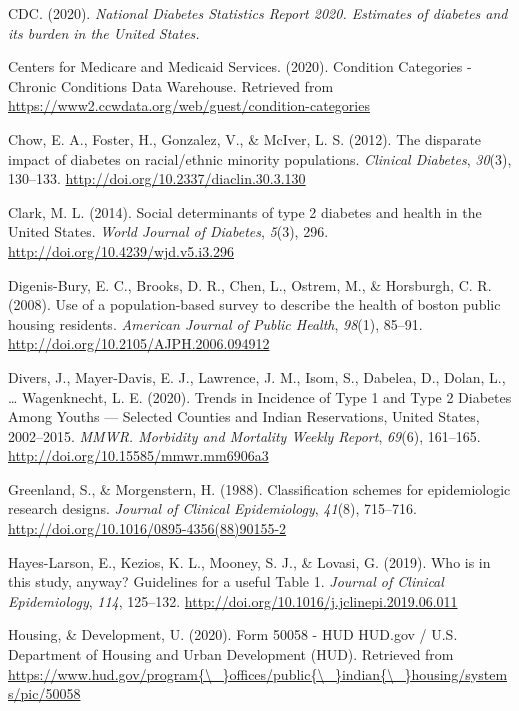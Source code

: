 \documentclass [11pt, proquest] {uwthesis}[2015/03/03]
\begin{document}
\hypertarget{ref-CDC2020}{}
CDC. (2020). \emph{National Diabetes Statistics Report 2020. Estimates
of diabetes and its burden in the United States.}

\hypertarget{ref-CMS2020}{}
Centers for Medicare and Medicaid Services. (2020). Condition Categories
- Chronic Conditions Data Warehouse. Retrieved from
\url{https://www2.ccwdata.org/web/guest/condition-categories}

\hypertarget{ref-Chow2012}{}
Chow, E. A., Foster, H., Gonzalez, V., \& McIver, L. S. (2012). The
disparate impact of diabetes on racial/ethnic minority populations.
\emph{Clinical Diabetes}, \emph{30}(3), 130--133.
\url{http://doi.org/10.2337/diaclin.30.3.130}

\hypertarget{ref-Clark2014}{}
Clark, M. L. (2014). Social determinants of type 2 diabetes and health
in the United States. \emph{World Journal of Diabetes}, \emph{5}(3),
296. \url{http://doi.org/10.4239/wjd.v5.i3.296}

\hypertarget{ref-Digenis-Bury2008}{}
Digenis-Bury, E. C., Brooks, D. R., Chen, L., Ostrem, M., \& Horsburgh,
C. R. (2008). Use of a population-based survey to describe the health of
boston public housing residents. \emph{American Journal of Public
Health}, \emph{98}(1), 85--91.
\url{http://doi.org/10.2105/AJPH.2006.094912}

\hypertarget{ref-Divers2020}{}
Divers, J., Mayer-Davis, E. J., Lawrence, J. M., Isom, S., Dabelea, D.,
Dolan, L., \ldots{} Wagenknecht, L. E. (2020). Trends in Incidence of
Type 1 and Type 2 Diabetes Among Youths --- Selected Counties and Indian
Reservations, United States, 2002--2015. \emph{MMWR. Morbidity and
Mortality Weekly Report}, \emph{69}(6), 161--165.
\url{http://doi.org/10.15585/mmwr.mm6906a3}

\hypertarget{ref-Greenland1988}{}
Greenland, S., \& Morgenstern, H. (1988). Classification schemes for
epidemiologic research designs. \emph{Journal of Clinical Epidemiology},
\emph{41}(8), 715--716.
\url{http://doi.org/10.1016/0895-4356(88)90155-2}

\hypertarget{ref-Hayes-Larson2019}{}
Hayes-Larson, E., Kezios, K. L., Mooney, S. J., \& Lovasi, G. (2019).
Who is in this study, anyway? Guidelines for a useful Table 1.
\emph{Journal of Clinical Epidemiology}, \emph{114}, 125--132.
\url{http://doi.org/10.1016/j.jclinepi.2019.06.011}

\hypertarget{ref-HUD2020}{}
Housing, \& Development, U. (2020). Form 50058 - HUD \textbar{} HUD.gov
/ U.S. Department of Housing and Urban Development (HUD). Retrieved from
\href{https://www.hud.gov/program\%7B/_\%7Doffices/public\%7B/_\%7Dindian\%7B/_\%7Dhousing/systems/pic/50058}{https://www.hud.gov/program\{\textbackslash{}\_\}offices/public\{\textbackslash{}\_\}indian\{\textbackslash{}\_\}housing/systems/pic/50058}
\end{document}
